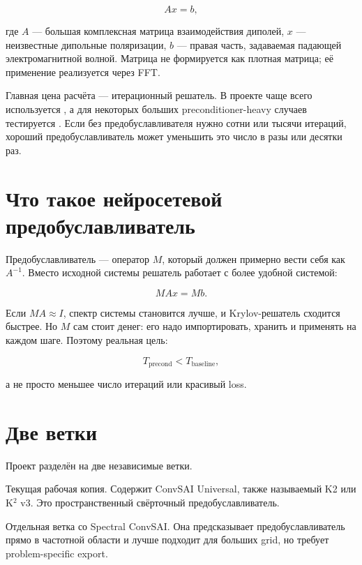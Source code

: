 \documentclass[11pt,a4paper,oneside]{book}
\newcommand{\code}[1]{\texttt{\detokenize{#1}}}
\begin{document}
\begin{equation}
  A x = b,
\end{equation}

где $A$ --- большая комплексная матрица взаимодействия диполей, $x$ ---
неизвестные дипольные поляризации, $b$ --- правая часть, задаваемая падающей
электромагнитной волной. Матрица не формируется как плотная матрица; её
применение реализуется через FFT.

Главная цена расчёта --- итерационный решатель. В проекте чаще всего
используется \code{BiCGStab}, а для некоторых больших preconditioner-heavy
случаев тестируется \code{FGMRES}. Если без предобуславливателя нужно сотни
или тысячи итераций, хороший предобуславливатель может уменьшить это число в
разы или десятки раз.

\section{Что такое нейросетевой предобуславливатель}

Предобуславливатель --- оператор $M$, который должен примерно вести себя как
$A^{-1}$. Вместо исходной системы решатель работает с более удобной системой:

\begin{equation}
  M A x = M b.
\end{equation}

Если $M A \approx I$, спектр системы становится лучше, и Krylov-решатель
сходится быстрее. Но $M$ сам стоит денег: его надо импортировать, хранить и
применять на каждом шаге. Поэтому реальная цель:

\begin{equation}
  T_{\mathrm{precond}} < T_{\mathrm{baseline}},
\end{equation}

а не просто меньшее число итераций или красивый loss.

\section{Две ветки}

Проект разделён на две независимые ветки.

\begin{description}[leftmargin=3.5cm,style=nextline]
  \item[\code{convsai-universal}]
  Текущая рабочая копия. Содержит ConvSAI Universal, также называемый K2 или
  K$^2$ v3. Это пространственный свёрточный предобуславливатель.

  \item[\code{spectral-convsai}]
  Отдельная ветка со Spectral ConvSAI. Она предсказывает предобуславливатель
  прямо в частотной области и лучше подходит для больших grid, но требует
  problem-specific export.
\end{description}
\end{document}
